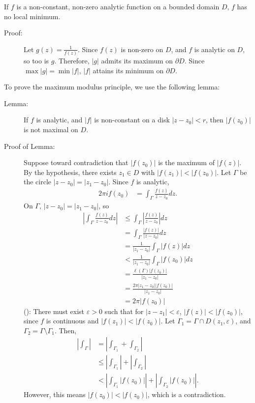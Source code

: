 \documentclass[10pt]{extarticle}
\begin{document}
  If $f$ is a non-constant, non-zero analytic function on a bounded domain $D$, $f$ has no local minimum.
  \begin{description}
    \item[Proof:] Let $g(z) = \frac{1}{f(z)}$. Since $f(z)$ is non-zero on $D$, and $f$ is analytic on $D$, so too is $g$. Therefore, $|g|$ admits its maximum on $\partial D$. Since $\max|g| = \min|f|$, $|f|$ attains its minimum on $\partial D$.
  \end{description}
  To prove the maximum modulus principle, we use the following lemma:
  \begin{description}
    \item[Lemma:] If $f$ is analytic, and $|f|$ is non-constant on a disk $|z-z_0| < r$, then $|f(z_0)|$ is not maximal on $D$.
    \item[Proof of Lemma:] Suppose toward contradiction that $|f(z_0)|$ is the maximum of $|f(z)|$. By the hypothesis, there exists $z_1\in D$ with $|f(z_1)| < |f(z_0)|$. Let $\Gamma$ be the circle $|z-z_0| = |z_1-z_0|$. Since $f$ is analytic,
      \begin{align*}
        2\pi if(z_0) &= \int_{\Gamma} \frac{f(z)}{z-z_0}dz.
      \end{align*}
      On $\Gamma$, $|z-z_0| = |z_1-z_0|$, so
      \begin{align*}
        \left|\int_{\Gamma}\frac{f(z)}{z-z_0}dz\right| &\leq \int_{\Gamma}\left|\frac{f(z)}{z-z_0}\right|dz\\
                                                       &= \int_{\Gamma}\frac{|f(z)|}{|z-z_0|}dz\\
                                                       &= \frac{1}{|z_1-z_0|}\int_{\Gamma}|f(z)|dz\\
                                                       &< \frac{1}{|z_1-z_0|} \int_{\Gamma}|f(z_0)|dz \tag*{(\textasteriskcentered)}\\
                                                       &= \frac{\ell(\Gamma)|f(z_0)|}{|z_1-z_0|}\\
                                                       &= \frac{2\pi|z_1-z_0||f(z_0)|}{|z_1-z_0|}\\
                                                       &= 2\pi |f(z_0)|
      \end{align*}
      (\textasteriskcentered): There must exist $\varepsilon > 0$ such that for $|z-z_1| < \varepsilon$, $|f(z)| < |f(z_0)|$, since $f$ is continuous and $|f(z_1)| < |f(z_0)|$. Let $\Gamma_1 = \Gamma \cap D(z_1,\varepsilon)$, and $\Gamma_2 = \Gamma \setminus \Gamma_1$. Then,
      \begin{align*}
        \left|\int_{\Gamma}\right| &= \left|\int_{\Gamma_1} + \int_{\Gamma_2}\right|\\
                                   &\leq \left|\int_{\Gamma_1}\right| + \left|\int_{\Gamma_2}\right|\\
                                   &< \left|\int_{\Gamma_1}|f(z_0)|\right| + \left|\int_{\Gamma_2}|f(z_0)|\right|.
      \end{align*}
      However, this means $|f(z_0)| < |f(z_0)|$, which is a contradiction.\\


\end{description}
\end{document}
